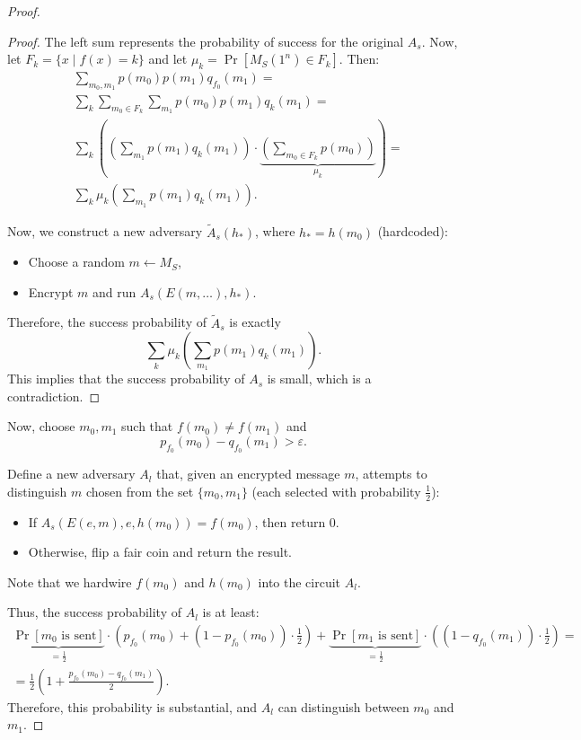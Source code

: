 \begin{proof}
\begin{proof}
		The left sum represents the probability of success for the original $A_s$.
		Now, let $F_k = \{x \mid f(x) = k\}$ and let $\mu_k = \Pr[M_S(1^{n}) \in F_k]$.
		Then:
		\begin{align*}
			&\sum_{m_0, m_1} p(m_0) p(m_1) q_{f_0}(m_1) = \\
			& \sum_{k} \sum_{m_0 \in F_k} \sum_{m_1} p(m_0) p(m_1) q_k(m_1) = \\   
			& \sum_{k} \left(\left(\sum_{m_1} p(m_1) q_k(m_1) \right) \cdot \underbrace{\left(\sum_{m_0 \in F_k} p(m_0)\right)}_{\mu_k} \right) = \\
			& \sum_{k} \mu_k \left( \sum_{m_1} p(m_1) q_k(m_1) \right).
		\end{align*}

		Now, we construct a new adversary $\tilde{A}_s(h_*)$, where $h_* = h(m_0)$ (hardcoded):
		\begin{itemize}
			\item Choose a random $m \gets M_S$,
			\item Encrypt $m$ and run $A_s(E(m, \ldots), h_*)$.
		\end{itemize}
		Therefore, the success probability of $\tilde{A}_s$ is exactly
		\[
		\sum_{k} \mu_k \left( \sum_{m_1} p(m_1) q_k(m_1) \right).
		\] 
		This implies that the success probability of $A_s$ is small, which is a contradiction.
	\end{proof}

	Now, choose $m_0, m_1$ such that $f(m_0) \neq f(m_1)$ and
	\[
		p_{f_0}(m_0) - q_{f_0}(m_1) > \varepsilon.
	\] 

	Define a new adversary $A_l$ that, given an encrypted message $m$, attempts to distinguish $m$ chosen from the set $\{m_0, m_1\}$ (each selected with probability $\frac{1}{2}$):
	\begin{itemize}
		\item If $A_s(E(e, m), e, h(m_0)) = f(m_0)$, then return 0.
		\item Otherwise, flip a fair coin and return the result.
	\end{itemize}
	Note that we hardwire $f(m_0)$ and $h(m_0)$ into the circuit $A_l$.

	Thus, the success probability of $A_l$ is at least:
	\begin{align*}
		\underbrace{\Pr[m_0 \text{ is sent}]}_{=\frac{1}{2}} \cdot \left(p_{f_0}(m_0) + (1 - p_{f_0}(m_0)) \cdot \frac{1}{2}\right) + \underbrace{\Pr[m_1 \text{ is sent}]}_{=\frac{1}{2}} \cdot \left((1 - q_{f_0}(m_1)) \cdot \frac{1}{2}\right) = \\
		= \frac{1}{2} \left(1 + \frac{p_{f_0}(m_0) - q_{f_0}(m_1)}{2}\right).
	\end{align*}
	Therefore, this probability is substantial, and $A_l$ can distinguish between $m_0$ and $m_1$.
\end{proof}

